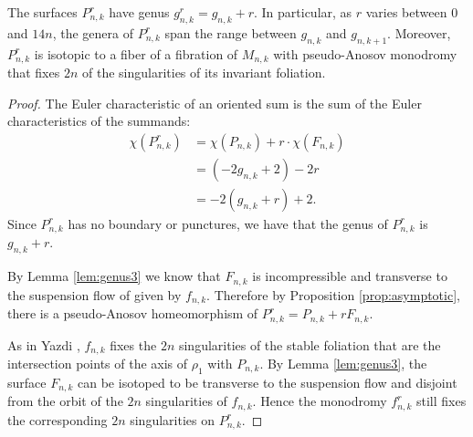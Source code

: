\begin{lem}
  The surfaces $P^r_{n,k}$ have genus $g^r_{n,k} = g_{n,k} + r$. In particular, as $r$ varies between
  $0$ and $14n$, the genera of $P^r_{n,k}$ span the range between $g_{n,k}$ and $g_{n,k+1}$. Moreover,
  $P^r_{n,k}$ is isotopic to a fiber of a fibration of $M_{n,k}$ with pseudo-Anosov monodromy that fixes $2n$
  of the singularities of its invariant foliation.
\end{lem}

\begin{proof}
  The Euler characteristic of an oriented sum is the sum of the Euler characteristics of the summands:
  \begin{align*}
    \chi(P^r_{n,k}) &= \chi(P_{n,k}) + r\cdot\chi(F_{n,k}) \\
                    &= (-2g_{n,k} + 2)-2r \\
                    &= -2(g_{n,k} + r) + 2.
  \end{align*}
  Since $P_{n,k}^r$ has no boundary or punctures, we have that the genus of $P_{n,k}^r$ is $g_{n,k}+r$.

  By Lemma \ref{lem:genus3} we know that $F_{n,k}$ is incompressible and transverse to the suspension flow of given by $f_{n,k}$.  Therefore by Proposition \ref{prop:asymptotic}, there is a pseudo-Anosov homeomorphism of $P_{n,k}^r=P_{n,k}+rF_{n,k}$.

 As in Yazdi \cite[Lemma 3.5]{yazdibounds}, $f_{n,k}$ fixes the $2n$ singularities of the stable foliation that are the intersection points of the axis of $\rho_1$ with
  $P_{n,k}$. By Lemma \ref{lem:genus3}, the surface $F_{n,k}$ can be isotoped to be transverse to
  the suspension flow and disjoint from the orbit of the $2n$ singularities of $f_{n,k}$.  Hence the monodromy
  $f^r_{n,k}$ still fixes the corresponding $2n$ singularities on $P^r_{n,k}$.
\end{proof}

